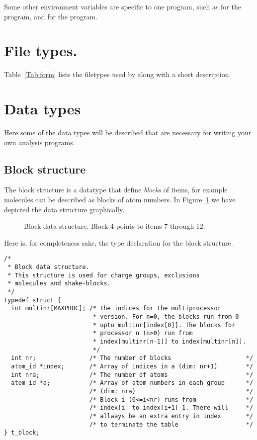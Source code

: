 Some other environment variables are specific to one program, such as
 for the {\tt {}} program, and
 for the {\tt {}} program.

\section{File types.}
\label{sec:fileformats}
Table~\ref{Tab:form} lists the filetypes used by {\gromacs} along with
a short description.


\section{Data types}
Here some of the data types will be described that are necessary for writing
your own analysis programs.

\subsection{Block structure}
The block structure is a datatype that define {\em blocks} of items,
for example molecules can be described as blocks of atom numbers.
In Figure~\ref{fig:block} we have depicted the data structure graphically.
\begin{figure}
\centerline{}
\caption{Block data structure. Block 4 points to items 7 through 12.}
\label{fig:block}
\end{figure}

Here is, for completeness sake,
the type declaration for the block structure.
\begin{verbatim}
/*
 * Block data structure.
 * This structure is used for charge groups, exclusions
 * molecules and shake-blocks.
 */
typedef struct {
  int multinr[MAXPROC]; /* The indices for the multiprocessor 
                         * version. For n=0, the blocks run from 0
                         * upto multinr[index[0]]. The blocks for 
                         * processor n (n>0) run from 
                         * index[multinr[n-1]] to index[multinr[n]].
                         */
  int nr;               /* The number of blocks                     */
  atom_id *index;       /* Array of indices in a (dim: nr+1)        */
  int nra;              /* The number of atoms                      */
  atom_id *a;           /* Array of atom numbers in each group      */
                        /* (dim: nra)                               */
                        /* Block i (0<=i<nr) runs from              */
                        /* index[i] to index[i+1]-1. There will     */
                        /* allways be an extra entry in index       */
                        /* to terminate the table                   */
} t_block;
\end{verbatim}




